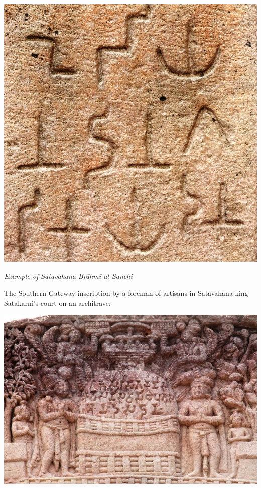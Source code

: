 \centerline{\includegraphics[scale=0.065]{"images/article-06/art06-fig01.jpg"}}

\textit{Example of Satavahana Brāhmī at Sanchi}

The Southern Gateway inscription by a foreman of artisans in Satavahana king Satakarni’s court on an architrave:

\vskip 4pt

\centerline{\includegraphics[scale=0.2]{"images/article-06/art06-fig02.jpg"}}

